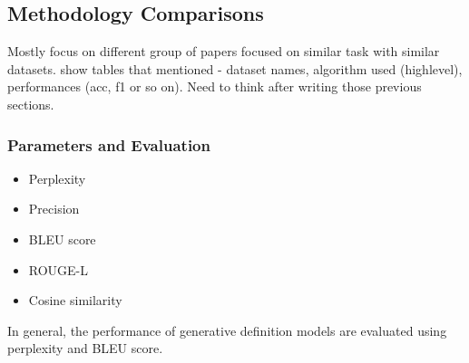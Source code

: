\subsection{Methodology Comparisons}
Mostly focus on different group of papers focused on similar task with similar
datasets. show tables that mentioned - dataset names, algorithm used
(highlevel), performances (acc, f1 or so on). Need to think after writing those
previous sections.

\subsubsection{Parameters and Evaluation}
\begin{itemize}
    \item Perplexity
    \item Precision
    \item BLEU score
    \item ROUGE-L
    \item Cosine similarity
\end{itemize}

In general, the performance of generative definition models are evaluated using
perplexity and BLEU score.
